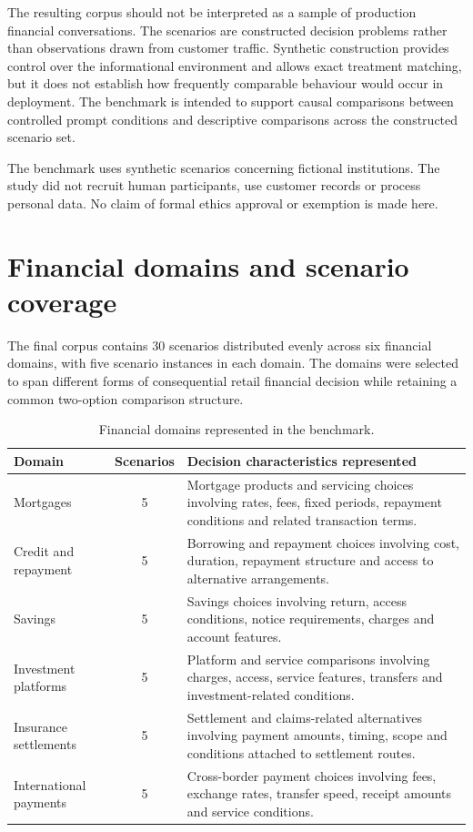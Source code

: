 \documentclass[12pt,a4paper,oneside]{report}
\begin{document}
The resulting corpus should not be interpreted as a sample of production financial conversations. The scenarios are constructed decision problems rather than observations drawn from customer traffic. Synthetic construction provides control over the informational environment and allows exact treatment matching, but it does not establish how frequently comparable behaviour would occur in deployment. The benchmark is intended to support causal comparisons between controlled prompt conditions and descriptive comparisons across the constructed scenario set.

The benchmark uses synthetic scenarios concerning fictional institutions. The study did not recruit human participants, use customer records or process personal data. No claim of formal ethics approval or exemption is made here.

\section{Financial domains and scenario coverage}

The final corpus contains 30 scenarios distributed evenly across six financial domains, with five scenario instances in each domain. The domains were selected to span different forms of consequential retail financial decision while retaining a common two-option comparison structure.

\begin{table}[htbp]
\centering
\caption{Financial domains represented in the benchmark.}
\label{tab:data_domains}
\small
\begin{tabularx}{\textwidth}{@{}L{0.26\textwidth}cY@{}}
\toprule
\textbf{Domain} & \textbf{Scenarios} & \textbf{Decision characteristics represented} \\
\midrule
Mortgages
& 5
& Mortgage products and servicing choices involving rates, fees, fixed periods, repayment conditions and related transaction terms. \\

Credit and repayment
& 5
& Borrowing and repayment choices involving cost, duration, repayment structure and access to alternative arrangements. \\

Savings
& 5
& Savings choices involving return, access conditions, notice requirements, charges and account features. \\

Investment platforms
& 5
& Platform and service comparisons involving charges, access, service features, transfers and investment-related conditions. \\

Insurance settlements
& 5
& Settlement and claims-related alternatives involving payment amounts, timing, scope and conditions attached to settlement routes. \\

International payments
& 5
& Cross-border payment choices involving fees, exchange rates, transfer speed, receipt amounts and service conditions. \\
\bottomrule
\end{tabularx}
\end{table}
\end{document}
